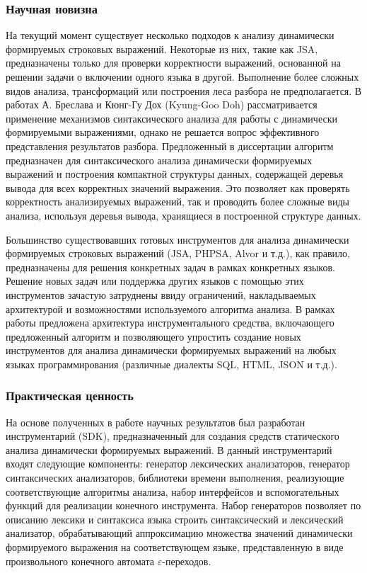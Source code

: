 \subsubsection*{\large{Научная новизна}}

На текущий момент существует несколько подходов к анализу динамически формируемых строковых выражений. Некоторые из них, такие как JSA, предназначены только для проверки корректности выражений, основанной на решении задачи о включении одного языка в другой. Выполнение более сложных видов анализа, трансформаций или построения леса разбора не предполагается. В работах А. Бреслава и Кюнг-Гу Дох (Kyung-Goo Doh) рассматривается применение механизмов синтаксического анализа для работы с динамически формируемыми выражениями, однако не решается вопрос эффективного представления результатов разбора. Предложенный в диссертации алгоритм предназначен для синтаксического анализа динамически формируемых выражений и построения компактной структуры данных, содержащей деревья вывода для всех корректных значений выражения. Это позволяет как проверять корректность анализируемых выражений, так и проводить более сложные виды анализа, используя деревья вывода, хранящиеся в построенной структуре данных.

Большинство существовавших готовых инструментов для анализа динамически формируемых строковых выражений (JSA, PHPSA, Alvor и т.д.), как правило, предназначены для решения конкретных задач в рамках конкретных языков. Решение новых задач или поддержка других языков с помощью этих инструментов зачастую затруднены ввиду ограничений, накладываемых архитектурой и возможностями используемого алгоритма анализа. В рамках работы предложена архитектура инструментального средства, включающего предложенный алгоритм и позволяющего упростить создание новых инструментов для анализа динамически формируемых выражений на любых языках программирования (различные диалекты SQL, HTML, JSON и т.д.).

\subsubsection*{\large{Практическая ценность}}

На основе полученных в работе научных результатов был разработан инструментарий (SDK), предназначенный для создания средств статического анализа динамически формируемых выражений. В данный инструментарий входят следующие компоненты: генератор лексических анализаторов, генератор синтаксических анализаторов, библиотеки времени выполнения, реализующие соответствующие алгоритмы анализа, набор интерфейсов и вспомогательных функций для реализации конечного инструмента. Набор генераторов позволяет по описанию лексики и синтаксиса языка строить синтаксический и лексический анализатор, обрабатывающий аппроксимацию множества значений динамически формируемого выражения на соответствующем языке, представленную в виде произвольного конечного автомата $\varepsilon$-переходов.

